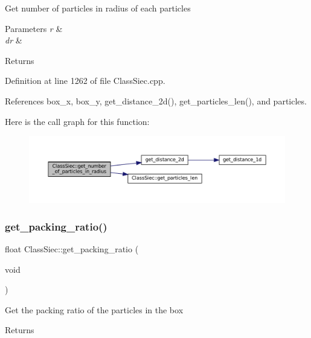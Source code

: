 Get number of particles in radius of each particles 
\begin{DoxyParams}{Parameters}
{\em r} & \\
\hline
{\em dr} & \\
\hline
\end{DoxyParams}
\begin{DoxyReturn}{Returns}

\end{DoxyReturn}


Definition at line 1262 of file Class\+Siec.\+cpp.



References box\+\_\+x, box\+\_\+y, get\+\_\+distance\+\_\+2d(), get\+\_\+particles\+\_\+len(), and particles.

Here is the call graph for this function\+:
\nopagebreak
\begin{figure}[H]
\begin{center}
\leavevmode
\includegraphics[width=350pt]{classClassSiec_a0c89392852117a823a1a603f4181b3a7_cgraph}
\end{center}
\end{figure}
\mbox{\label{classClassSiec_a1b7f3db9473b2660b3a6c1dfeee45e22}} 
\subsubsection{\texorpdfstring{get\+\_\+packing\+\_\+ratio()}{get\_packing\_ratio()}}
{\footnotesize\ttfamily float Class\+Siec\+::get\+\_\+packing\+\_\+ratio (\begin{DoxyParamCaption}\item[{void}]{ }\end{DoxyParamCaption})}

Get the packing ratio of the particles in the box \begin{DoxyReturn}{Returns}

\end{DoxyReturn}


